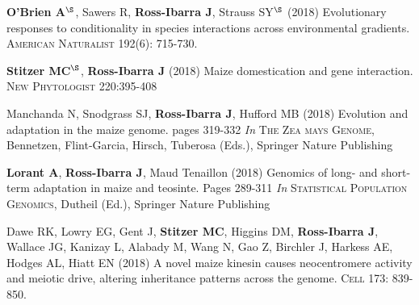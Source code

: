 \documentclass[letterpaper,10pt]{article}
\begin{document}
\begin{etaremune}
\item \textbf{O'Brien A}$^\S$, Sawers R, \textbf{Ross-Ibarra J}, Strauss  SY$^\S$ (2018) Evolutionary responses to conditionality in species interactions across environmental gradients. \textsc{American Naturalist} 192(6): 715-730.

\item \textbf{Stitzer MC}$^\S$, \textbf{Ross-Ibarra J} (2018) Maize domestication and gene interaction. \textsc{New Phytologist} 220:395-408

\item Manchanda N, Snodgrass SJ, \textbf{Ross-Ibarra J}, Hufford MB (2018) Evolution and adaptation in the maize genome. pages 319-332 \textit{In} \textsc{The Zea mays Genome}, Bennetzen, Flint-Garcia, Hirsch, Tuberosa (Eds.), Springer Nature Publishing 

\item \textbf{Lorant A}, \textbf{Ross-Ibarra J}, Maud Tenaillon (2018) Genomics of long- and short- term adaptation in maize and teosinte. Pages 289-311 \textit{In} \textsc{Statistical Population Genomics},  Dutheil (Ed.), Springer Nature Publishing 

\item Dawe RK, Lowry EG, Gent J, \textbf{Stitzer MC}, Higgins DM, \textbf{Ross-Ibarra J}, Wallace JG, Kanizay L, Alabady M, Wang N, Gao Z, Birchler J, Harkess AE, Hodges AL, Hiatt EN (2018) A novel maize kinesin causes neocentromere activity and meiotic drive, altering inheritance patterns across the genome. \textsc{Cell} 173: 839-850.


\end{etaremune}
\end{document}
